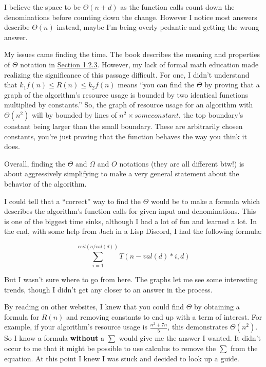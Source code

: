 \documentclass[final,fleqn,titlepage]{article}
\begin{document}
I believe the space to be \(\Theta(n+d)\) as the function calls count down the
denominations before counting down the change. However I notice most answers
describe \(\Theta(n)\) instead, maybe I'm being overly pedantic and getting the
wrong answer.

My issues came finding the time. The book describes the meaning and properties
of \(\Theta\) notation in \href{http://sarabander.github.io/sicp/html/1\_002e2.xhtml\#g\_t1\_002e2\_002e3}{Section 1.2.3}. However, my lack of formal math
education made realizing the significance of this passage difficult. For one, I
didn't understand that \(k_{1}f(n) \leq R(n) \leq k_{2}f(n)\) means ``you can
find the \(\Theta\) by proving that a graph of the algorithm's resource usage is
bounded by two identical functions multiplied by constants.'' So, the graph of
resource usage for an algorithm with \(\Theta(n^{2})\) will by bounded by lines
of \(n^{2} \times some constant\), the top boundary's constant being larger than
the small boundary. These are arbitrarily chosen constants, you're just proving
that the function behaves the way you think it does.

Overall, finding the \(\Theta\) and \(\Omega\) and \(O\) notations (they are all
different btw!) is about aggressively simplifying to make a very general
statement about the behavior of the algorithm.

I could tell that a ``correct'' way to find the \(\Theta\) would be to make a
formula which describes the algorithm's function calls for given input and
denominations. This is one of the biggest time sinks, although I had a lot of
fun and learned a lot. In the end, with some help from Jach in a Lisp Discord, I
had the following formula:

\[
\sum_{i=1}^{ceil(n / val(d))} T(n - val(d)*i, d)
\]

But I wasn't sure where to go from here. The graphs let me see some interesting
trends, though I didn't get any closer to an answer in the process.

By reading on other websites, I knew that you could find \(\Theta\) by obtaining
a formula for \(R(n)\) and removing constants to end up with a term of interest.
For example, if your algorithm's resource usage is \(\frac{n^{2} + 7n}{5}\),
this demonstrates \(\Theta(n^{2})\). So I know a formula \textbf{without} a \(\sum\)
would give me the answer I wanted. It didn't occur to me that it might be
possible to use calculus to remove the \(\sum\) from the equation. At this point
I knew I was stuck and decided to look up a guide.
\end{document}
